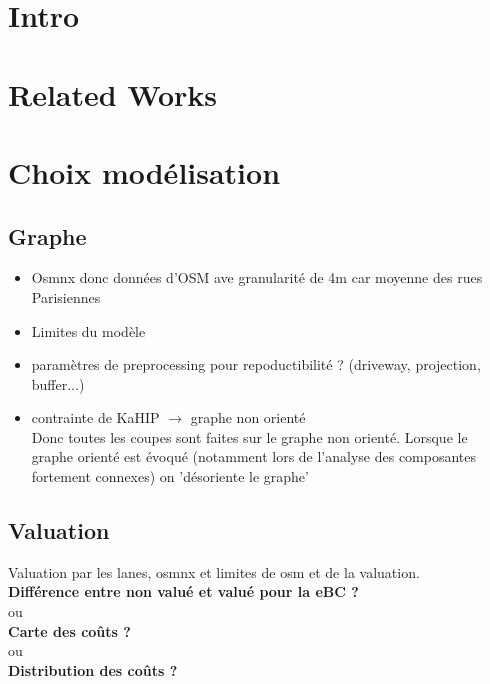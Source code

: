 \documentclass{article}
\begin{document}
\section{Intro}

\section{Related Works}

\section{Choix modélisation}
\subsection{Graphe}
\begin{itemize}
    \item Osmnx donc données d'OSM ave granularité de 4m car moyenne des rues Parisiennes
    \item Limites du modèle
    \item paramètres de preprocessing pour repoductibilité ? (driveway, projection, buffer...)
    \item contrainte de KaHIP $\rightarrow$ graphe non orienté\\
    Donc toutes les coupes sont faites sur le graphe non orienté. Lorsque le graphe orienté est évoqué (notamment lors de l'analyse des composantes fortement connexes) on 'désoriente le graphe'
    
\end{itemize}

\subsection{Valuation}
Valuation par les lanes, osmnx et limites de osm et de la valuation.\\
\textbf{Différence entre non valué et valué pour la eBC ?}\\
ou\\
\textbf{Carte des coûts ?}\\
ou\\
\textbf{Distribution des coûts ?}
\end{document}
